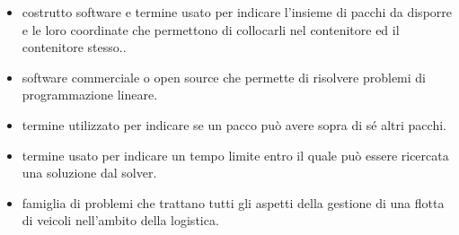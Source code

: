 \begin{itemize}
	\item {} costrutto software e termine usato per indicare l'insieme di pacchi da disporre e le loro coordinate che permettono di collocarli nel contenitore ed il contenitore stesso..
	\item {} software commerciale o open source che permette di risolvere problemi di programmazione lineare.
	\item {} termine utilizzato per indicare se un pacco può avere sopra di sé altri pacchi.
	\item {} termine usato per indicare un tempo limite entro il quale può essere ricercata una soluzione dal solver.
	\item {} famiglia di problemi che trattano tutti gli aspetti della gestione di una flotta di veicoli nell'ambito della logistica.
\end{itemize} 
